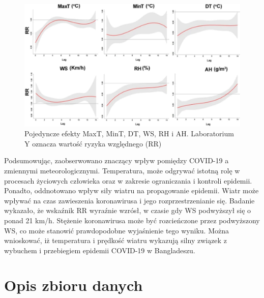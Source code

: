 \documentclass[polish, twoside, 12pt, a4paper]{article}
\theoremstyle{definition}
\theoremstyle{plain}
\theoremstyle{remark}
\begin{document}
\begin{figure}[h]
\centering
\includegraphics[width=15cm]{clmate-factors.jpg}
\caption{Pojedyncze efekty MaxT, MinT, DT, WS, RH i AH. Laboratorium Y oznacza wartość ryzyka względnego (RR)}
\end{figure}

Podsumowując, zaobserwowano znaczący wpływ pomiędzy COVID-19 a zmiennymi meteorologicznymi. Temperatura, może odgrywać istotną rolę w procesach życiowych człowieka oraz w zakresie ograniczania i kontroli epidemii. Ponadto, oddnotowano wpływ siły wiatru na propagowanie epidemii. Wiatr może wpływać na czas zawieszenia koronawirusa i jego rozprzestrzenianie się. Badanie wykazało, że wskaźnik RR wyraźnie wzrósł, w czasie gdy WS podwyższył się o ponad 21 km/h. Stężenie koronawirusa może być rozcieńczone przez podwyższony WS, co może stanowić prawdopodobne wyjaśnienie tego wyniku. Można wnioskować, iż temperatura i prędkość wiatru wykazują silny związek z wybuchem i przebiegiem epidemii COVID-19 w Bangladeszu. \cite{hasanuzzaman2020}



\clearpage
\section{Opis zbioru danych}
\label{chapter:data-set}

\end{document}
